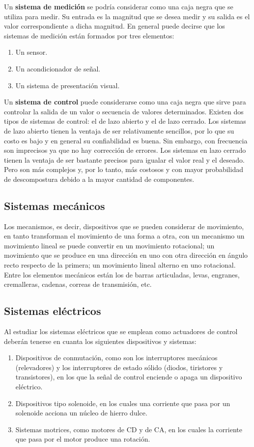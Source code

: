 Un \textbf{sistema de medición} se podría considerar como una caja negra que se utiliza para medir. Su entrada es la magnitud que se desea medir y su salida es el valor correspondiente a dicha magnitud.  En general puede decirse que los sistemas de medición están formados por tres elementos:
\begin{enumerate}
    \item Un sensor.
    \item Un acondicionador de señal.
    \item Un sistema de presentación visual.
\end{enumerate}
Un \textbf{sistema de control} puede considerarse como una caja negra que sirve para controlar la salida de un valor o secuencia de valores determinados. Existen dos tipos de sistemas de control: el de lazo abierto y el de lazo cerrado. Los sistemas de lazo abierto tienen la ventaja de ser relativamente sencillos, por lo que su costo es bajo y en general su confiabilidad es buena. Sin embargo, con frecuencia son imprecisos ya que no hay corrección de errores. Los sistemas en lazo cerrado tienen la ventaja de ser bastante precisos para igualar el valor real y el deseado. Pero son más complejos y, por lo tanto, más costosos y con mayor probabilidad de descompostura debido a la mayor cantidad de componentes.
\subsection{Sistemas mecánicos}
Los mecanismos, es decir, dispositivos que se pueden considerar de movimiento, en tanto transforman el movimiento de una forma a otra, con un mecanismo un movimiento lineal se puede convertir en un movimiento rotacional; un movimiento que se produce en una dirección en uno con otra dirección en ángulo recto respecto de la primera; un movimiento lineal alterno en uno rotacional. Entre los elementos mecánicos están los de barras articuladas, levas, engranes, cremalleras, cadenas, correas de transmisión, etc.
\subsection{Sistemas eléctricos}
Al estudiar los sistemas eléctricos que se emplean como actuadores de control deberán tenerse en cuanta los siguientes dispositivos y sistemas:
\begin{enumerate}
    \item Dispositivos de conmutación, como son los interruptores mecánicos (relevadores) y los interruptores de estado sólido (diodos, tiristores y transistores), en los que la señal de control enciende o apaga un dispositivo eléctrico.
    \item Dispositivos tipo solenoide, en los cuales una corriente que pasa por un solenoide acciona un núcleo de hierro dulce.
    \item Sistemas motrices, como motores de CD y de CA, en los cuales la corriente que pasa por el motor produce una rotación.
\end{enumerate}

